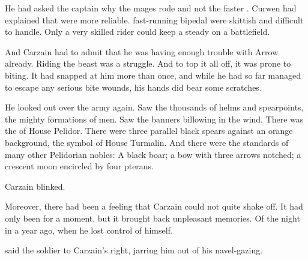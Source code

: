 He had asked the captain why the mages rode \relcs{} and not the faster \mikshas. 
Curwen had explained that \relcs{} were more reliable. 
\Mikshas{}\dash fast-running bipedal \saurians\dash were skittish and difficult to handle. 
Only a very skilled rider could keep a \miksha{} steady on a battlefield. 

And Carzain had to admit that he was having enough trouble with Arrow already. 
Riding the beast was a struggle. 
And to top it all off, it was prone to biting. 
It had snapped at him more than once, and while he had so far managed to escape any serious bite wounds, his hands did bear some scratches. 

He looked out over the army again. 
Saw the thousands of helms and spearpoints, the mighty formations of men. 
Saw the banners billowing in the wind. 
There was the \grulcan{} of House Pelidor. 
There were three parallel black spears against an orange background, the symbol of House Turmalin. 
And there were the standards of many other Pelidorian nobles: 
A black boar; 
a bow with three arrows notched; 
a crescent moon encircled by four pterans. 


Carzain blinked. 


Moreover, there had been a feeling that Carzain could not quite shake off. 
It had only been for a moment, but it brought back unpleasant memories. 
Of the night in  a year ago, when he lost control of himself. 


\begin{comment}
\section{Delph and \Tsekkect}
\end{comment}

 said the \meccaran{} soldier to Carzain's right, jarring him out of his navel-gazing. 

